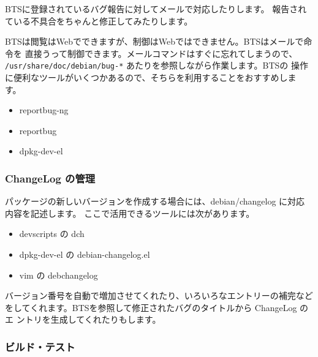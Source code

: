 \documentclass[mingoth,a4paper]{jsarticle}
\begin{document}
BTSに登録されているバグ報告に対してメールで対応したりします。
報告されている不具合をちゃんと修正してみたりします。

BTSは閲覧はWebでできますが、制御はWebではできません。BTSはメールで命令を
直接うって制御できます。メールコマンドはすぐに忘れてしまうので、
\texttt{/usr/share/doc/debian/bug-*} あたりを参照しながら作業します。BTSの
操作に便利なツールがいくつかあるので、そちらを利用することをおすすめしま
す。

\begin{itemize}
 \item  reportbug-ng 
 \item  reportbug
 \item  dpkg-dev-el 
\end{itemize}

 \subsubsection{ChangeLog の管理}

パッケージの新しいバージョンを作成する場合には、debian/changelog に対応
内容を記述します。
ここで活用できるツールには次があります。

\begin{itemize}
 \item devscripts の dch
 \item dpkg-dev-el の debian-changelog.el
 \item vim の debchangelog 
\end{itemize}

バージョン番号を自動で増加させてくれたり、いろいろなエントリーの補完など
をしてくれます。BTSを参照して修正されたバグのタイトルから ChangeLog のエ
ントリを生成してくれたりもします。


\subsubsection{ビルド・テスト}
\end{document}
